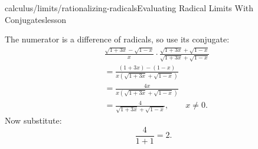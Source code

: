 \begin{webpage}{calculus/limits/rationalizing-radicals}{Evaluating Radical Limits With Conjugates}{lesson}
\begin{bgexample}[title={Exam-level: two radical terms}]
\begin{bgsolution}
The numerator is a difference of radicals, so use its conjugate:
\begin{align*}
&\frac{\sqrt{1+3x}-\sqrt{1-x}}{x}
\cdot
\frac{\sqrt{1+3x}+\sqrt{1-x}}{\sqrt{1+3x}+\sqrt{1-x}}\\
&=\frac{(1+3x)-(1-x)}{x\left(\sqrt{1+3x}+\sqrt{1-x}\right)}\\
&=\frac{4x}{x\left(\sqrt{1+3x}+\sqrt{1-x}\right)}\\
&=\frac4{\sqrt{1+3x}+\sqrt{1-x}},\qquad x\ne0.
\end{align*}
Now substitute:
\[
  \frac4{1+1}=\boxed{2}.
\]
\end{bgsolution}
\end{bgexample}
\end{webpage}

